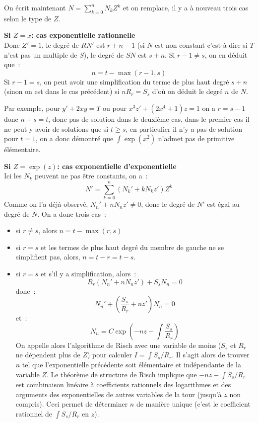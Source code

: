 \documentclass[a4paper,11pt]{article}
\begin{document}
\begin{giacjshere}
On \'ecrit maintenant $N=\sum_{k=0}^n N_k Z^k$ et on remplace, 
il y a \`a nouveau trois cas selon le type de $Z$.

{\bf Si $Z=x$: cas exponentielle rationnelle}\\
Donc $Z'=1$, le degré de $RN'$ est $r+n-1$ (si $N$ est non constant
c'est-à-dire si $T$ n'est pas un multiple de $S$), le degré de
$SN$ est $s+n$. Si $r-1\neq s$, on en déduit que~:
\[ n=t-\max(r-1,s)\]
Si $r-1=s$, on peut avoir
une simplification du terme de plus haut degré $s+n$ (sinon
on est dans le cas précédent) si $n R_r =S_s $
d'où on déduit le degré $n$ de $N$.

Par exemple, pour $y'+2xy=T$ ou pour $x^3z'+(2x^4+1)z=1$ on a $r=s-1$ donc
$n+s=t$, donc pas de solution dans le deuxième cas, dans le premier cas
il ne peut y avoir de solutions que si $t \geq s$, en particulier
il n'y a pas de solution pour $t=1$, on a donc démontré que $\int \exp(x^2)$
n'admet pas de primitive élémentaire.

{\bf Si $Z=\exp(z)$: cas exponentielle d'exponentielle}\\
Ici les $N_k$ peuvent ne pas être constants, on a~:
\[ N'=\sum_{k=0}^n (N_k'+kN_k z') Z^k\]
Comme on l'a déjà observé, $N_n'+n N_n z'\neq 0$, donc le
degré de $N'$ est égal au degré de $N$. On a donc trois cas~:
\begin{itemize} 
\item si $r\neq s$, alors $n=t-\max(r,s)$
\item si $r=s$ et les termes de plus haut degré du membre de gauche ne
se simplifient pas, alors, $n=t-r=t-s$.
\item si $r=s$ et s'il y a simplification, alors~:
\[ R_r(N_n'+nN_nz')+S_sN_n=0 \]
donc~:
\[ N_n' + (\frac{S_s}{R_r}+nz')N_n = 0\]
et~:
\[ N_n = C \exp(-nz-\int \frac{S_s}{R_r}) \]
On appelle alors l'algorithme de Risch avec une variable de moins ($S_s$
et $R_r$ ne dépendent plus de $Z$) pour calculer $I=\int S_s/R_r$. 
Il s'agit alors de trouver $n$ tel que l'exponentielle précédente
soit élémentaire et indépendante de la variable $Z$. Le théorème
de structure de Risch implique que $-nz-\int S_s/R_r$ est combinaison 
linéaire à coefficients rationnels des logarithmes et des arguments 
des exponentielles de autres variables de la tour (jusqu'à $z$ non compris).
Ceci permet de déterminer $n$ de manière unique (c'est le coefficient
rationnel de $\int S_s/R_r$ en $z$).
\end{itemize}


\end{giacjshere}
\end{document}
